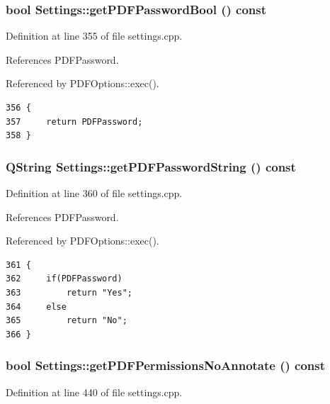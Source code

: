\hypertarget{classSettings_a46}{
\subsubsection[getPDFPasswordBool]{\setlength{\rightskip}{0pt plus 5cm}bool Settings::get\-PDFPassword\-Bool () const}}
\label{classSettings_a46}


Definition at line 355 of file settings.cpp.

References PDFPassword.

Referenced by PDFOptions::exec().

\footnotesize\begin{verbatim}356 {
357     return PDFPassword;
358 }
\end{verbatim}\normalsize 


\hypertarget{classSettings_a47}{
\subsubsection[getPDFPasswordString]{\setlength{\rightskip}{0pt plus 5cm}QString Settings::get\-PDFPassword\-String () const}}
\label{classSettings_a47}


Definition at line 360 of file settings.cpp.

References PDFPassword.

Referenced by PDFOptions::exec().

\footnotesize\begin{verbatim}361 {
362     if(PDFPassword)
363         return "Yes";
364     else
365         return "No";
366 }
\end{verbatim}\normalsize 


\hypertarget{classSettings_a56}{
\subsubsection[getPDFPermissionsNoAnnotate]{\setlength{\rightskip}{0pt plus 5cm}bool Settings::get\-PDFPermissions\-No\-Annotate () const}}
\label{classSettings_a56}


Definition at line 440 of file settings.cpp.

